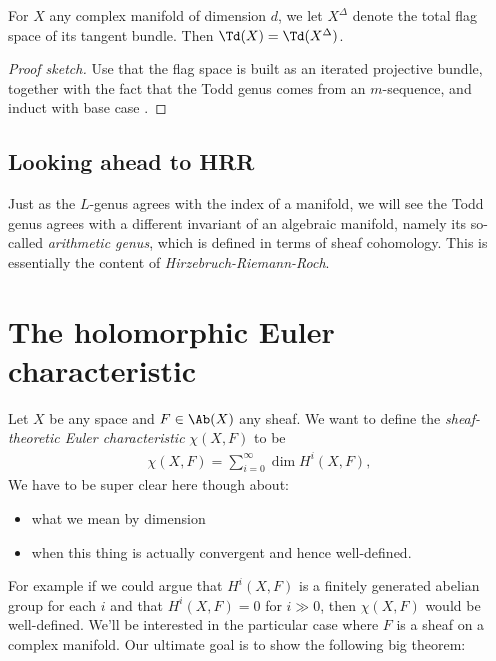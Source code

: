 \documentclass[11pt]{book}
\begin{document}
\begin{corollary}\label{cor:Td-X-XDelta}
For $X$ any complex manifold of dimension $d$, we let $X^\Delta$ denote the total flag space of its tangent bundle. Then $\Td(X) = \Td(X^\Delta)$. 
\end{corollary}
\begin{proof}[Proof sketch] Use that the flag space is built as an iterated projective bundle, together with the fact that the Todd genus comes from an $m$-sequence, and induct with base case .
\end{proof}



\subsection{Looking ahead to HRR}

Just as the $L$-genus agrees with the index of a manifold, we will see the Todd genus agrees with a different invariant of an algebraic manifold, namely its so-called \emph{arithmetic genus}, which is defined in terms of sheaf cohomology. This is essentially the content of \emph{Hirzebruch-Riemann-Roch}.

\section{The holomorphic Euler characteristic}

\begin{definition}\label{def:sheaf-theoretic-Euler-char} 
Let $X$ be any space and $F\in \Ab(X)$ any sheaf. We want to define the \emph{sheaf-theoretic Euler characteristic} $\chi(X,F)$ to be
\begin{align*}
    \chi(X,F) = \sum_{i=0}^\infty \dim H^i(X,F),
\end{align*}
We have to be super clear here though about:
\begin{itemize}
    \item what we mean by dimension
    \item when this thing is actually convergent and hence well-defined.
\end{itemize}
\end{definition}

For example if we could argue that $H^i(X,F)$ is a finitely generated abelian group for each $i$ and that $H^i(X,F)=0$ for $i\gg0$, then $\chi(X,F)$ would be well-defined. We'll be interested in the particular case where $F$ is a sheaf on a complex manifold. Our ultimate goal is to show the following big theorem:
\end{document}

